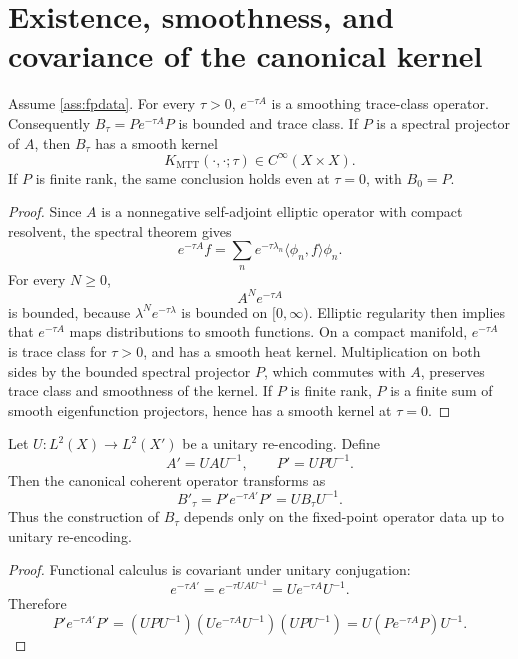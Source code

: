 \documentclass[11pt]{article}
\begin{document}
\section{Existence, smoothness, and covariance of the canonical kernel}

\begin{theorem}\label{thm:smoothing}
Assume \cref{ass:fpdata}. For every \(\tau>0\), \(e^{-\tau A}\) is a smoothing trace-class
operator. Consequently \(B_\tau=P e^{-\tau A}P\) is bounded and trace class. If \(P\) is a
spectral projector of \(A\), then \(B_\tau\) has a smooth kernel
\[
        K_{\mathrm{MTT}}(\cdot,\cdot;\tau)\in C^\infty(X\times X).
\]
If \(P\) is finite rank, the same conclusion holds even at \(\tau=0\), with \(B_0=P\).
\end{theorem}

\begin{proof}
Since \(A\) is a nonnegative self-adjoint elliptic operator with compact resolvent,
the spectral theorem gives
\[
        e^{-\tau A}f
        =
        \sum_n e^{-\tau\lambda_n}\langle \phi_n,f\rangle\phi_n.
\]
For every \(N\ge 0\),
\[
        A^N e^{-\tau A}
\]
is bounded, because \(\lambda^N e^{-\tau\lambda}\) is bounded on \([0,\infty)\).
Elliptic regularity then implies that \(e^{-\tau A}\) maps distributions to smooth functions.
On a compact manifold, \(e^{-\tau A}\) is trace class for \(\tau>0\), and has a smooth heat
kernel. Multiplication on both sides by the bounded spectral projector \(P\), which commutes
with \(A\), preserves trace class and smoothness of the kernel. If \(P\) is finite rank,
\(P\) is a finite sum of smooth eigenfunction projectors, hence has a smooth kernel at
\(\tau=0\). 
\end{proof}

\begin{theorem}\label{thm:covariance}
Let \(U:L^2(X)\to L^2(X')\) be a unitary re-encoding. Define
\[
        A'=UAU^{-1},\qquad P'=UPU^{-1}.
\]
Then the canonical coherent operator transforms as
\[
        B'_\tau=P'e^{-\tau A'}P'=UB_\tau U^{-1}.
\]
Thus the construction of \(B_\tau\) depends only on the fixed-point operator data up to
unitary re-encoding.
\end{theorem}

\begin{proof}
Functional calculus is covariant under unitary conjugation:
\[
        e^{-\tau A'}=e^{-\tau UAU^{-1}}=Ue^{-\tau A}U^{-1}.
\]
Therefore
\[
        P'e^{-\tau A'}P'
        =
        (UPU^{-1})(Ue^{-\tau A}U^{-1})(UPU^{-1})
        =
        U(Pe^{-\tau A}P)U^{-1}.
\]
\end{proof}
\end{document}
